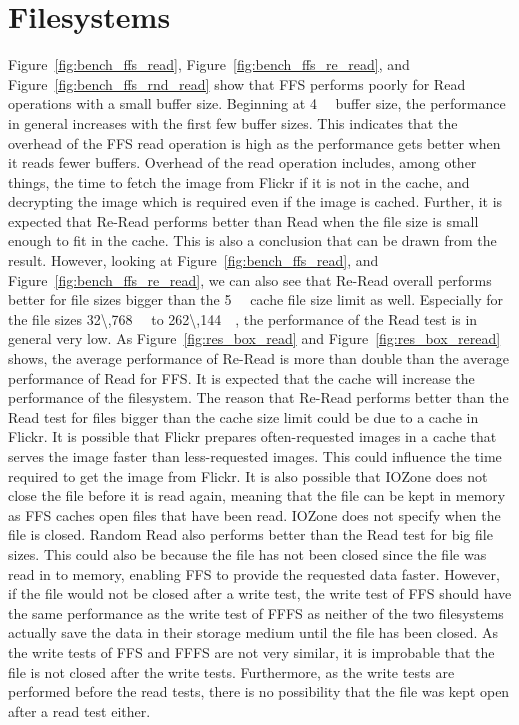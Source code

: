 \section{Filesystems}
\label{sec:dis_fs}
Figure~\ref{fig:bench_ffs_read}, Figure~\ref{fig:bench_ffs_re_read}, and Figure~\ref{fig:bench_ffs_rnd_read} show that \gls{FFS} performs poorly for Read operations with a small buffer size. Beginning at \SI{4}{\kilo\byte} buffer size, the performance in general increases with the first few buffer sizes. This indicates that the overhead of the \gls{FFS} read operation is high as the performance gets better when it reads fewer buffers. Overhead of the read operation includes, among other things, the time to fetch the image from Flickr if it is not in the cache, and decrypting the image which is required even if the image is cached. Further, it is expected that \mbox{Re-Read} performs better than Read when the file size is small enough to fit in the cache. This is also a conclusion that can be drawn from the result. However, looking at Figure~\ref{fig:bench_ffs_read}, and Figure~\ref{fig:bench_ffs_re_read}, we can also see that \mbox{Re-Read} overall performs better for file sizes bigger than the \SI{5}{\mega\byte} cache file size limit as well. Especially for the file sizes \SI{32\,768}{\kilo\byte} to \SI{262\,144}{\kilo\byte}, the performance of the Read test is in general very low. As Figure~\ref{fig:res_box_read} and Figure~\ref{fig:res_box_reread} shows, the average performance of \mbox{Re-Read} is more than double than the average performance of Read for \gls{FFS}. It is expected that the cache will increase the performance of the filesystem. The reason that \mbox{Re-Read} performs better than the Read test for files bigger than the cache size limit could be due to a cache in Flickr. It is possible that Flickr prepares often-requested images in a cache that serves the image faster than less-requested images. This could influence the time required to get the image from Flickr. It is also possible that IOZone does not close the file before it is read again, meaning that the file can be kept in memory as \gls{FFS} caches open files that have been read. IOZone does not specify when the file is closed.  Random Read also performs better than the Read test for big file sizes. This could also be because the file has not been closed since the file was read in to memory, enabling \gls{FFS} to provide the requested data faster. However, if the file would not be closed after a write test, the write test of \gls{FFS} should have the same performance as the write test of \gls{FFFS} as neither of the two filesystems actually save the data in their storage medium until the file has been closed. As the write tests of \gls{FFS} and \gls{FFFS} are not very similar, it is improbable that the file is not closed after the write tests. Furthermore, as the write tests are performed before the read tests, there is no possibility that the file was kept open after a read test either.

